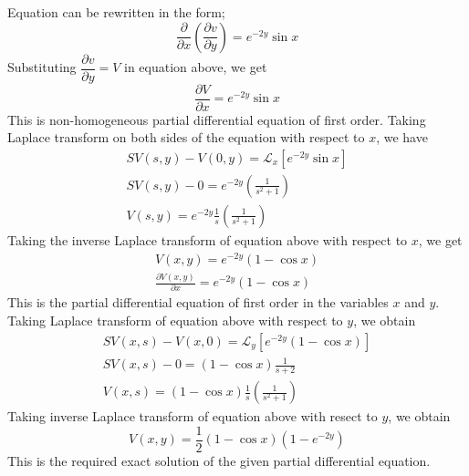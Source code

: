 \documentclass[11pt]{report}
\newcommand{\Laplace}{\mathcal{L}}
\newcommand{\NI}{\noindent}
\newcommand{\sps}{\\[0.2cm]}
\newcommand{\dsp}{\displaystyle}
\begin{document}
	\NI Equation can be rewritten in the form;
	\begin{equation*}
		\frac{\partial}{\partial x}\left(\frac{\partial v}{\partial y}\right) = e^{-2y}\sin x \label{p:4_1_3} 
	\end{equation*}
	Substituting $\dfrac{\partial v}{\partial y} = V$ in equation above, we get
	\begin{equation*}
		\frac{\partial V}{\partial x}=e^{-2y}\sin x\label{p:4_1_4} 
	\end{equation*}
	This is non-homogeneous partial differential equation of first order. Taking Laplace transform on both sides of the equation with respect to $x$, we have
	\begin{equation*}
		\begin{array}{l}
			\dsp SV(s,y) - V(0,y) = \Laplace_x\left[e^{-2y}\sin x\right]\sps
			\dsp SV(s,y) - 0 = e^{-2y}\left(\frac{1}{s^2+1}\right)\sps
			\dsp V(s,y) = e^{-2y}\frac{1}{s}\left(\frac{1}{s^2+1}\right)
		\end{array}\label{p:4_1_5} 
	\end{equation*}
	Taking the inverse Laplace transform of equation above with respect to $x$, we get
	\begin{equation*}
		\begin{array}{l}
			\dsp V(x,y) = e^{-2y}(1-\cos x)\sps
			\dsp\frac{\partial V(x,y)}{\partial x} = e^{-2y}(1-\cos x)
		\end{array}\label{p:4_1_6} 
	\end{equation*}
	This is the partial differential equation of first order in the variables $x$ and $y$.\\
	
	\NI Taking Laplace transform of equation above with respect to $y$, we obtain
	\begin{equation*}
		\begin{array}{l}
			\dsp SV(x,s)-V(x,0) = \Laplace_y\left[e^{-2y}(1-\cos x)\right]\sps
			\dsp SV(x,s) - 0 = (1-\cos x )\frac{1}{s+2}\sps
			\dsp V(x,s) = (1-\cos x)\frac{1}{s}\left(\frac{1}{s^2+1}\right)
		\end{array}
		\label{p:4_1_7} 
	\end{equation*}
	Taking inverse Laplace transform of equation above with resect to $y$, we obtain
	\begin{equation*}
		V(x,y)=\frac{1}{2}(1-\cos x)(1-e^{-2y}) \label{p:4_1_8} 
	\end{equation*}
	This is the required exact solution of the given partial differential equation.
	
\end{document}
